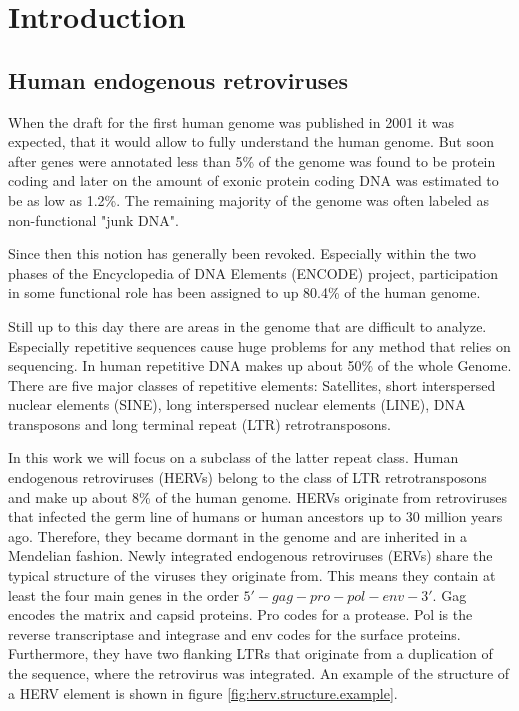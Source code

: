 \documentclass[a4paper,12pt,twoside,openright]{report}
\begin{document}
\newpage


\tableofcontents
\newpage

\pagestyle{plain}
\chapter{Introduction} 
\label{Introduction}

\section{Human endogenous retroviruses}
\label{Introduction:Human endogenous retroviruses}

When the draft for the first human genome was published in 2001\cite{Venter1304} it was expected, that it would allow to fully understand the human genome. But soon after genes were annotated less than 5\% of the genome was found to be protein coding\cite{Consortium2001} and later on the amount of exonic protein coding DNA was estimated to be as low as 1.2\%\cite{Encode2012}. The remaining majority of the genome was often labeled as non-functional "junk DNA"\cite{Pennisi1159}. 

Since then this notion has generally been revoked. Especially within the two phases of the Encyclopedia of DNA Elements (ENCODE) project\cite{Encode2012}, participation in some functional role has been assigned to up 80.4\% of the human genome. 

Still up to this day there are areas in the genome that are difficult to analyze. Especially repetitive sequences cause huge problems for any method that relies on sequencing\cite{Treangen2011}. In human repetitive DNA makes up about 50\% of the whole Genome\cite{Treangen2011}. There are five major classes of repetitive elements: Satellites, short interspersed nuclear elements (SINE), long interspersed nuclear elements (LINE), DNA transposons and long terminal repeat (LTR) retrotransposons. 

In this work we will focus on a subclass of the latter repeat class. Human endogenous retroviruses (HERVs) belong to the class of LTR retrotransposons and make up about 8\% of the human genome\cite{APM:APM12476}. HERVs originate from retroviruses that infected the germ line of humans or human ancestors up to 30 million years ago\cite{10.1146/annurev.genom.7.080505.115700}. Therefore, they became dormant in the genome and are inherited in a Mendelian fashion. Newly integrated endogenous retroviruses (ERVs) share the typical structure of the viruses they originate from. This means they contain at least the four main genes in the order $5'-gag-pro-pol-env-3'$. Gag encodes the matrix and capsid proteins. Pro codes for a protease. Pol is the reverse transcriptase and integrase and env codes for the surface proteins. Furthermore, they have two flanking LTRs that originate from a duplication of the sequence, where the retrovirus was integrated\cite{10.1146/annurev.genom.7.080505.115700}. An example of the structure of a HERV element is shown in figure \ref{fig:herv.structure.example}.
\end{document}
